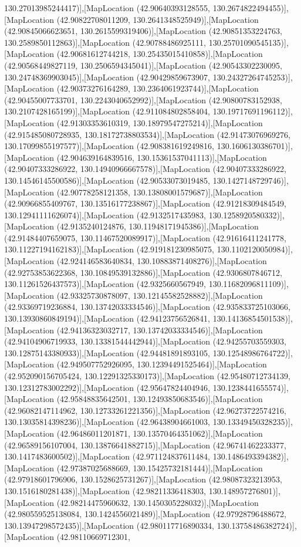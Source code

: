 130.27013985244417)],[MapLocation (42.90640393128555, 130.2674822494455)],[MapLocation (42.90822708011209, 130.2641348525949)],[MapLocation (42.90845066623651, 130.2615599319406)],[MapLocation (42.90851353224763, 130.2589850112863)],[MapLocation (42.90788486925111, 130.25701090545135)],[MapLocation (42.90681612744218, 130.25435015410858)],[MapLocation (42.90568449827119, 130.2506594345041)],[MapLocation (42.90543302230095, 130.24748369903045)],[MapLocation (42.90429859673907, 130.24327264745253)],[MapLocation (42.90373276164289, 130.2364061923744)],[MapLocation (42.90455007733701, 130.2243040652992)],[MapLocation (42.90800783152938, 130.2107428165199)],[MapLocation (42.911084802858404, 130.19717691196112)],[MapLocation (42.91303353610319, 130.18979547275214)],[MapLocation (42.915485080728935, 130.18172738803534)],[MapLocation (42.91473076969276, 130.17099855197577)],[MapLocation (42.908381619249816, 130.1606130386701)],[MapLocation (42.904639164839516, 130.15361537041113)],[MapLocation (42.90407333286922, 130.14940966667578)],[MapLocation (42.90407333286922, 130.14546145500586)],[MapLocation (42.90533073019485, 130.1427148729746)],[MapLocation (42.90778258121358, 130.13808001579687)],[MapLocation (42.90966855409767, 130.13516177238867)],[MapLocation (42.91218309484549, 130.12941111626074)],[MapLocation (42.9132517435983, 130.1258920580332)],[MapLocation (42.9135240124876, 130.11948171945386)],[MapLocation (42.91484407659075, 130.11467520089917)],[MapLocation (42.91616411241778, 130.11227194162183)],[MapLocation (42.919181230985075, 130.1102120050984)],[MapLocation (42.924146583640834, 130.10883871408276)],[MapLocation (42.92753853622368, 130.10849539132886)],[MapLocation (42.9306807846712, 130.11261526437573)],[MapLocation (42.9325660567949, 130.11682096811109)],[MapLocation (42.93325730878097, 130.12145582528882)],[MapLocation (42.93369719236884, 130.13742033334546)],[MapLocation (42.935833725103066, 130.13930860849194)],[MapLocation (42.94123756526841, 130.14136854501538)],[MapLocation (42.94136323032717, 130.13742033334546)],[MapLocation (42.94104906719933, 130.13381544442944)],[MapLocation (42.94255703559303, 130.12875143380933)],[MapLocation (42.94481891893105, 130.12548986764722)],[MapLocation (42.949507752926095, 130.12394491525464)],[MapLocation (42.952090156705424, 130.12291325330173)],[MapLocation (42.95480712734139, 130.12312783002292)],[MapLocation (42.95647824404946, 130.1238441655574)],[MapLocation (42.95848835642501, 130.12493850683546)],[MapLocation (42.96082147114962, 130.12733261221356)],[MapLocation (42.96273722574216, 130.13035814398236)],[MapLocation (42.96438904661003, 130.13349450328235)],[MapLocation (42.96486011201871, 130.13570464351062)],[MapLocation (42.96589156107004, 130.13876641882715)],[MapLocation (42.96741462233377, 130.1417483600502)],[MapLocation (42.971124837611484, 130.1486493394382)],[MapLocation (42.97387025688669, 130.15425732181444)],[MapLocation (42.97918601796906, 130.1528625731267)],[MapLocation (42.98087323213953, 130.1516180281438)],[MapLocation (42.98211336418303, 130.148957276801)],[MapLocation (42.98214475960632, 130.1450305228032)],[MapLocation (42.980559525138084, 130.1424556021489)],[MapLocation (42.97928796488672, 130.13947298572435)],[MapLocation (42.980117716890334, 130.13758486382724)],[MapLocation (42.98110669712301, 